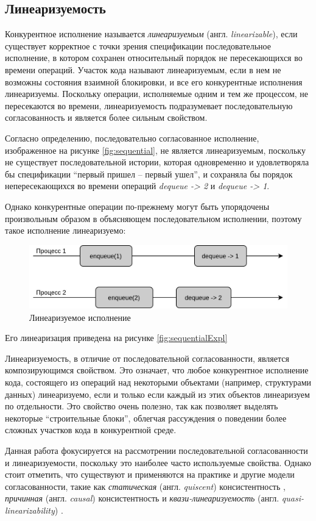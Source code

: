 \documentclass[14pt, openany]{book}
\begin{document}
\subsection{Линеаризуемость}
Конкурентное исполнение называется \textit{линеаризуемым} (англ. \textit{linearizable}), если существует корректное с точки зрения спецификации последовательное исполнение, в котором сохранен относительный порядок не пересекающихся во времени операций. Участок кода называют линеаризуемым, если в нем не возможны состояния взаимной блокировки, и все его конкурентные исполнения линеаризуемы. Поскольку операции, исполняемые одним и тем же процессом, не пересекаются во времени, линеаризуемость подразумевает последовательную согласованность и является более сильным свойством. \cite{linearizable} \par
Согласно определению, последовательно согласованное исполнение, изображенное на рисунке \ref{fig:sequential}, не является линеаризуемым, поскольку не существует последовательной истории, которая одновременно и удовлетворяла бы спецификации ``первый пришел -- первый ушел'', и сохраняла бы порядок непересекающихся во времени операций \textit{dequeue -> 2} и \textit{dequeue -> 1}.\par
Однако конкурентные операции по-прежнему могут быть упорядочены произвольным образом в объясняющем последовательном исполнении, поэтому такое исполнение линеаризуемо:

\begin{figure}[h]
\caption{Линеаризуемое исполнение}
\vspace{2mm}
\centering
\includegraphics[scale=0.4]{Linearizable.jpg}
\end{figure}
\noindent Его линеаризация приведена на рисунке \ref{fig:sequentialExpl}\par

Линеаризуемость, в отличие от последовательной согласованности, является композирующимся свойством. \cite{linearizable} Это означает, что любое конкурентное исполнение кода, состоящего из операций над некоторыми объектами (например, структурами данных)  линеаризуемо, если и только если каждый из этих объектов линеаризуем по отдельности. Это свойство очень полезно, так как позволяет выделять некоторые ``строительные блоки'', облегчая рассуждения о поведении более сложных участков кода в конкурентной среде. \par
Данная работа фокусируется на рассмотрении последовательной согласованности и линеаризуемости, поскольку это наиболее часто используемые свойства. Однако стоит отметить, что существуют и применяются на практике и другие модели согласованности, такие как \textit{статическая} (англ. 
\textit{quiscent}) консистентность \cite{quiscent}, \textit{причинная} (англ. \textit{causal}) консистентность \cite{causal} и \textit{квази-линеаризуемость} (англ. \textit{quasi-linearizability}) \cite{quasi}.
\end{document}
